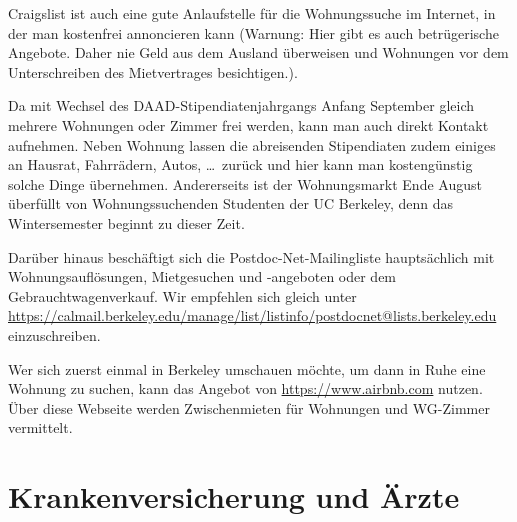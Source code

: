 \documentclass[a4paper]{scrreprt}
\begin{document}
Craigslist ist auch eine gute Anlaufstelle für die Wohnungssuche im
Internet, in der man kostenfrei annoncieren kann (Warnung: Hier gibt
es auch betrügerische Angebote. Daher nie Geld aus dem Ausland
überweisen und Wohnungen vor dem Unterschreiben des Mietvertrages
besichtigen.).

Da mit Wechsel des DAAD-Stipendiatenjahrgangs Anfang September gleich
mehrere Wohnungen oder Zimmer frei werden, kann man auch direkt
Kontakt aufnehmen. Neben Wohnung lassen die abreisenden Stipendiaten
zudem einiges an Hausrat, Fahrrädern, Autos, \dots\ zurück und hier kann
man kostengünstig solche Dinge übernehmen. Andererseits ist der Wohnungsmarkt Ende August \"uberf\"ullt von Wohnungssuchenden Studenten der UC Berkeley, denn das Wintersemester beginnt zu dieser Zeit.

Darüber hinaus beschäftigt sich die Postdoc-Net-Mailingliste
hauptsächlich mit Wohnungsauflösungen, Mietgesuchen und -angeboten
oder dem Gebrauchtwagenverkauf. Wir empfehlen sich gleich unter
\url{https://calmail.berkeley.edu/manage/list/listinfo/postdocnet@lists.berkeley.edu}
einzuschreiben.

Wer sich zuerst einmal in Berkeley umschauen möchte, um dann in Ruhe
eine Wohnung zu suchen, kann das Angebot von
\url{https://www.airbnb.com} nutzen. Über diese Webseite werden 
Zwischenmieten für Wohnungen und WG-Zimmer vermittelt. 

\section{Krankenversicherung und Ärzte}
\end{document}
